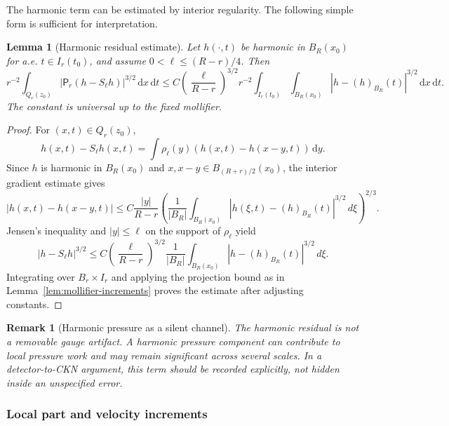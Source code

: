 \documentclass[11pt]{article}
\numberwithin{equation}{section}
\newtheorem{lemma}[theorem]{Lemma}
\newtheorem{remark}[theorem]{Remark}
\newcommand{\dxdt}{\,\mathrm dx\,\mathrm dt}
\newcommand{\dy}{\,\mathrm dy}
\newcommand{\Pf}{\mathsf P}
\begin{document}
The harmonic term can be estimated by interior regularity.  The following simple form is sufficient for interpretation.

\begin{lemma}[Harmonic residual estimate]\label{lem:harmonic-residual}
Let $h(\cdot,t)$ be harmonic in $B_R(x_0)$ for a.e. $t\in I_r(t_0)$, and assume $0<\ell\le (R-r)/4$.  Then
\begin{equation}\label{eq:harmonic-residual-bound}
r^{-2}\int_{Q_r(z_0)}|\Pf_r(h-S_\ell h)|^{3/2}\dxdt
\le
C\left(\frac{\ell}{R-r}\right)^{3/2}
 r^{-2}\int_{I_r(t_0)}\int_{B_R(x_0)}|h-(h)_{B_R}(t)|^{3/2}\dxdt.
\end{equation}
The constant is universal up to the fixed mollifier.
\end{lemma}

\begin{proof}
For $(x,t)\in Q_r(z_0)$,
\[
h(x,t)-S_\ell h(x,t)=\int\rho_\ell(y)(h(x,t)-h(x-y,t))\dy.
\]
Since $h$ is harmonic in $B_R(x_0)$ and $x,x-y\in B_{(R+r)/2}(x_0)$, the interior gradient estimate gives
\[
|h(x,t)-h(x-y,t)|
\le
C\frac{|y|}{R-r}\left(\frac{1}{|B_R|}\int_{B_R(x_0)}|h(\xi,t)-(h)_{B_R}(t)|^{3/2}\,d\xi\right)^{2/3}.
\]
Jensen's inequality and $|y|\le\ell$ on the support of $\rho_\ell$ yield
\[
|h-S_\ell h|^{3/2}
\le
C\left(\frac{\ell}{R-r}\right)^{3/2}
\frac{1}{|B_R|}\int_{B_R(x_0)}|h-(h)_{B_R}(t)|^{3/2}\,d\xi.
\]
Integrating over $B_r\times I_r$ and applying the projection bound as in Lemma~\ref{lem:mollifier-increments} proves the estimate after adjusting constants.
\end{proof}

\begin{remark}[Harmonic pressure as a silent channel]
The harmonic residual is not a removable gauge artifact.  A harmonic pressure component can contribute to local pressure work and may remain significant across several scales.  In a detector-to-CKN argument, this term should be recorded explicitly, not hidden inside an unspecified error.
\end{remark}

\subsubsection{Local part and velocity increments}
\end{document}
